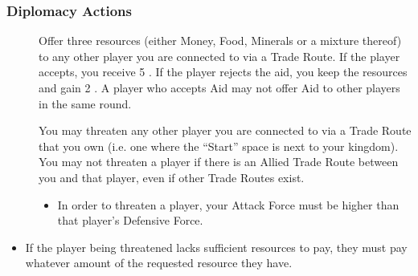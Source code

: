 \documentclass[10pt,twocolumn]{article}
\begin{document}
\subsubsection{Diplomacy Actions}
\begin{description}
\item[] Offer three resources (either Money, Food, Minerals or a mixture thereof) to any other player you are connected to via a Trade Route. If the player accepts, you receive 5 \vps. If the player rejects the aid, you keep the resources and gain 2 \vps. A player who accepts Aid may not offer Aid to other players in the same round.
\item[] You may threaten any other player you are connected to via a Trade Route that you own (i.e. one where the ``Start'' space is next to your kingdom). You may not threaten a player if there is an Allied Trade Route between you and that player, even if other Trade Routes exist.
\begin{itemize}
\item In order to threaten a player, your Attack Force must be higher than that player's Defensive Force.
\end{itemize}
\end{description}
\begin{itemize}
\iftoggle{original-rules}{
\item If your Attack Force is sufficient, you may demand either \eraCost{3}{4}{5} Money or \eraCost{2}{3}{4} \vps. The player being threatened must pay if possible.
}{
\item If your Attack Force is higher than your opponents Defensive Force, you may demand either 3 Money or 2 \vps. The player being threatened must pay if possible.
\item If your Attack Force is 5 or more points higher than your opponents Defensive force, the demanded amounts increase to 5 Money or 4 \vps. The player being threatened must pay if possible.
}
\item If the player being threatened lacks sufficient resources to pay, they must pay whatever amount of the requested resource they have.
\end{itemize}
\end{document}
